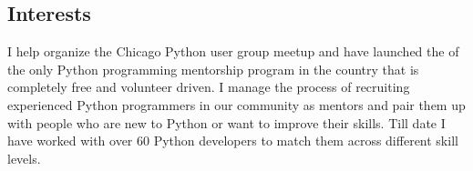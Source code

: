 \documentclass[a4paper, oneside, final]{scrartcl}
\begin{document}
\begin{center}
\section{Interests}
\small\sffamily{}
\item I help organize the Chicago Python user group meetup and have
launched the of the only Python programming mentorship program in the
country that is completely free and volunteer driven. I manage the
process of recruiting experienced Python programmers in our community
as mentors and pair them up with people who are new to Python or want
to improve their skills. Till date I have worked with over 60 Python developers
to match them across different skill levels.






\end{center}
\end{document}
